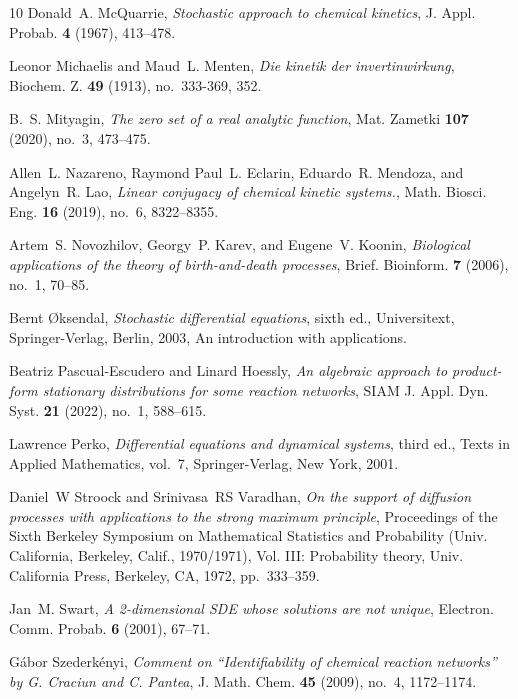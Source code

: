 \documentclass[10pt,a4paper]{amsart}
\theoremstyle{definition}
\theoremstyle{remark}
\theoremstyle{consequence}
\numberwithin{equation}{section}
\begin{document}
\begin{thebibliography}{10}
Donald~A. McQuarrie, \emph{Stochastic approach to chemical kinetics}, J. Appl.
  Probab. \textbf{4} (1967), 413--478.

Leonor Michaelis and Maud~L. Menten, \emph{Die kinetik der invertinwirkung},
  Biochem. Z. \textbf{49} (1913), no.~333-369, 352.

B.~S. Mityagin, \emph{The zero set of a real analytic function}, Mat. Zametki
  \textbf{107} (2020), no.~3, 473--475. 

Allen~L. Nazareno, Raymond Paul~L. Eclarin, Eduardo~R. Mendoza, and Angelyn~R.
  Lao, \emph{Linear conjugacy of chemical kinetic systems.}, Math. Biosci. Eng.
  \textbf{16} (2019), no.~6, 8322--8355.

Artem~S. Novozhilov, Georgy~P. Karev, and Eugene~V. Koonin, \emph{{Biological
  applications of the theory of birth-and-death processes}}, Brief. Bioinform.
  \textbf{7} (2006), no.~1, 70--85.

Bernt {\O}ksendal, \emph{Stochastic differential equations}, sixth ed.,
  Universitext, Springer-Verlag, Berlin, 2003, An introduction with
  applications.

Beatriz Pascual-Escudero and Linard Hoessly, \emph{An algebraic approach to
  product-form stationary distributions for some reaction networks}, SIAM J.
  Appl. Dyn. Syst. \textbf{21} (2022), no.~1, 588--615.

Lawrence Perko, \emph{Differential equations and dynamical systems}, third ed.,
  Texts in Applied Mathematics, vol.~7, Springer-Verlag, New York, 2001.

Daniel~W Stroock and Srinivasa~RS Varadhan, \emph{On the support of diffusion
  processes with applications to the strong maximum principle}, Proceedings of
  the {S}ixth {B}erkeley {S}ymposium on {M}athematical {S}tatistics and
  {P}robability ({U}niv. {C}alifornia, {B}erkeley, {C}alif., 1970/1971), {V}ol.
  {III}: {P}robability theory, Univ. California Press, Berkeley, CA, 1972,
  pp.~333--359.

Jan~M. Swart, \emph{A 2-dimensional {SDE} whose solutions are not unique},
  Electron. Comm. Probab. \textbf{6} (2001), 67--71.

G\'abor Szederk\'enyi, \emph{Comment on ``{I}dentifiability of chemical
  reaction networks'' by {G}. {C}raciun and {C}. {P}antea}, J. Math. Chem.
  \textbf{45} (2009), no.~4, 1172--1174.


\end{thebibliography}
\end{document}
